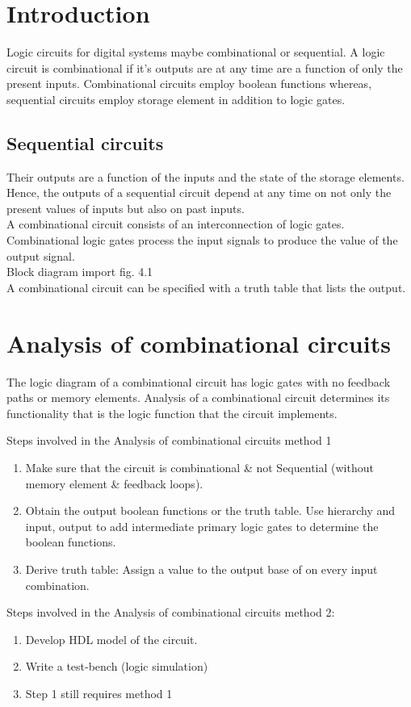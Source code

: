 \section{Introduction}
Logic circuits for digital systems maybe combinational or sequential. A logic circuit is combinational if it's outputs are at any time are a function of only the present inputs. Combinational circuits employ boolean functions whereas, sequential circuits employ storage element in addition to logic gates.\\
\subsection{Sequential circuits} Their outputs are a function of the inputs and the state of the storage elements. Hence, the outputs of a sequential circuit depend at any time on not only the present values of inputs but also on past inputs.\\ 
A combinational circuit consists of an interconnection of logic gates. Combinational logic gates process the input signals to produce the value of the output signal.\\
Block diagram import fig. 4.1\\ 
A combinational circuit can be specified with a truth table that lists the output.

\section{Analysis of combinational circuits} 
The logic diagram of a combinational circuit has logic gates with no feedback paths or memory elements. Analysis of a combinational circuit determines its functionality that is the logic function that the circuit implements. 

Steps involved in the Analysis of combinational circuits method 1
\begin{enumerate}
    \item Make sure that the circuit is combinational \& not Sequential (without memory element \& feedback loops).
    \item Obtain the output boolean functions or the truth table. Use hierarchy and input, output to add intermediate primary logic gates to determine the boolean functions.
    \item Derive truth table: Assign a value to the output base of on every input combination. 
\end{enumerate} 

Steps involved in the Analysis of combinational circuits method 2: 
\begin{enumerate}
    \item Develop HDL model of the circuit.
    \item Write a test-bench (logic simulation)
    \item Step 1 still requires method 1
\end{enumerate}


